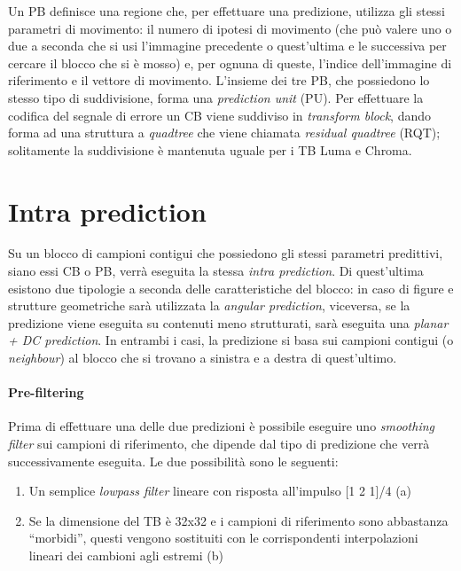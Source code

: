 Un PB definisce una regione che, per effettuare una predizione, utilizza gli 
stessi parametri di movimento: il numero di ipotesi di movimento (che può 
valere uno o due a seconda che si usi l'immagine precedente o quest'ultima 
e le successiva per cercare il blocco che si è mosso) e, per ognuna di queste, 
l'indice dell'immagine di riferimento e il vettore di movimento.
L'insieme dei tre PB, che possiedono lo stesso tipo di suddivisione, 
forma una \emph{prediction unit} (PU).
Per effettuare la codifica del segnale di errore un CB viene suddiviso in 
\emph{transform block}, dando forma ad una struttura a \emph{quadtree} che 
viene chiamata \emph{residual quadtree} (RQT); solitamente la suddivisione 
è mantenuta uguale per i TB Luma e Chroma.
\section{Intra prediction}
Su un blocco di campioni contigui che possiedono gli stessi parametri 
predittivi, siano essi CB o PB, verrà eseguita la stessa 
\emph{intra prediction}.
Di quest'ultima esistono due tipologie a seconda delle caratteristiche 
del blocco: in caso di figure e strutture geometriche sarà utilizzata 
la \emph{angular prediction}, viceversa, se la predizione viene eseguita 
su contenuti meno strutturati, sarà eseguita una \emph{planar + DC prediction}. 
In entrambi i casi, la predizione si basa sui campioni contigui (o 
\emph{neighbour}) al blocco che si trovano a sinistra e a destra di 
quest'ultimo.

\paragraph*{Pre-filtering}
Prima di effettuare una delle due predizioni è possibile eseguire uno 
\emph{smoothing filter} sui campioni di riferimento, che dipende dal tipo di 
predizione che verrà successivamente eseguita. Le due possibilità sono le 
seguenti:
\begin{enumerate}
\item Un semplice \emph{lowpass filter} lineare con risposta all'impulso 
[1 2 1]/4 (a)
\item Se la dimensione del TB è 32x32 e i campioni di riferimento sono 
abbastanza ``morbidi'', questi vengono sostituiti con le corrispondenti 
interpolazioni lineari dei cambioni agli estremi (b)
\end{enumerate}


